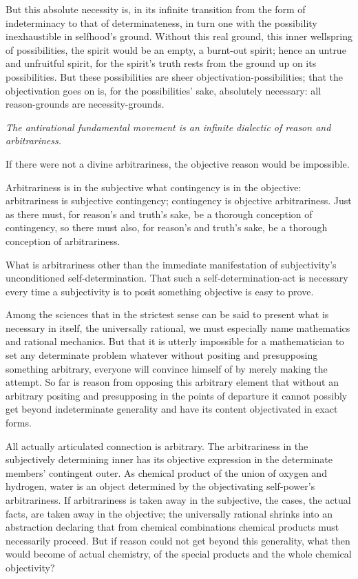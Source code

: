 \documentclass[12pt]{book}
\begin{document}
But this absolute necessity is, in its infinite transition from the
form of indeterminacy to that of determinateness, in turn one with
the possibility inexhaustible in selfhood's ground. Without this
real ground, this inner wellspring of possibilities, the spirit
would be an empty, a burnt-out spirit; hence an untrue and unfruitful
spirit, for the spirit's truth rests from the ground up on its
possibilities. But these possibilities are sheer
objectivation-possibilities; that the objectivation goes on is, for
the possibilities' sake, absolutely necessary: all reason-grounds
are necessity-grounds.

\emph{The antirational fundamental movement is an infinite dialectic
of reason and arbitrariness.}

If there were not a divine arbitrariness, the objective reason would
be impossible.

Arbitrariness is in the subjective what contingency is in the
objective: arbitrariness is subjective contingency; contingency is
objective arbitrariness. Just as there must, for reason's and
truth's sake, be a thorough conception of contingency, so there must
also, for reason's and truth's sake, be a thorough conception of
arbitrariness.

What is arbitrariness other than the immediate manifestation of
subjectivity's unconditioned self-determination. That such a
self-determination-act is necessary every time a subjectivity is to
posit something objective is easy to prove.

Among the sciences that in the strictest sense can be said to
present what is necessary in itself, the universally rational, we
must especially name mathematics and rational mechanics. But that it
is utterly impossible for a mathematician to set any determinate
problem whatever without positing and presupposing something
arbitrary, everyone will convince himself of by merely making the
attempt. So far is
reason from opposing this arbitrary element that without an
arbitrary positing and presupposing in the points of departure it
cannot possibly get beyond indeterminate generality and have its
content objectivated in exact forms.

All actually articulated connection is arbitrary. The arbitrariness
in the subjectively determining inner has its objective expression
in the determinate members' contingent outer. As chemical product of
the union of oxygen and hydrogen, water is an object determined by
the objectivating self-power's arbitrariness. If arbitrariness is
taken away in the subjective, the cases, the actual facts, are taken
away in the objective; the universally rational shrinks into an
abstraction declaring that from chemical combinations chemical
products must necessarily proceed. But if reason could not get
beyond this generality, what then would become of actual chemistry,
of the special products and the whole chemical objectivity?
\end{document}
